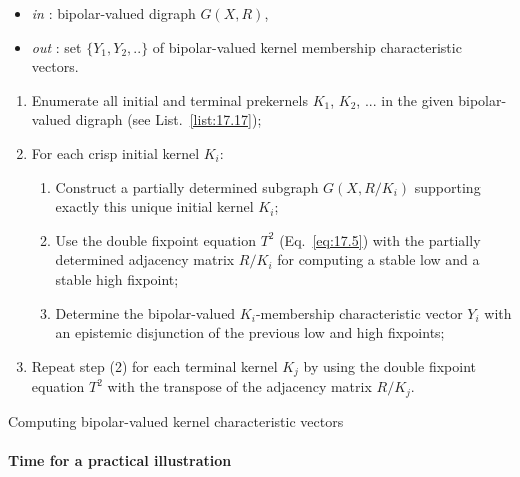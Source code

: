 \begin{algorithm}[H]
  {\footnotesize
\begin{itemize}
 \item [] \emph{in} : bipolar-valued digraph $G(X,R)$,
 \item [] \emph{out} : set $\{Y_1, Y_2, .. \}$ of bipolar-valued kernel membership characteristic vectors.
\end{itemize}
\begin{enumerate}
\item Enumerate all initial and terminal prekernels $K_1$, $K_2$, ... in the given bipolar-valued digraph (see List.~\vref{list:17.17});
\item For each crisp initial kernel $K_i$:
  \begin{enumerate}
  \item Construct a partially determined subgraph $G(X,R/K_i)$ supporting exactly this unique initial kernel $K_i$;
  \item Use the double fixpoint equation $T^2$ (Eq.~\ref{eq:17.5}) with the partially determined adjacency matrix $R/K_i$ for computing a stable low and a stable high fixpoint;
   \item \label{step:2.c} Determine the bipolar-valued $K_i$-membership characteristic vector $Y_i$ with an epistemic disjunction of the previous low and high fixpoints;
  \end{enumerate}
\item Repeat step (2) for each terminal kernel $K_j$ by using the double fixpoint equation $T^2$ with the transpose of the adjacency matrix $R/K_j$.
\end{enumerate}
}
\caption{Computing bipolar-valued kernel characteristic vectors}
\label{alg:17.1}
\end{algorithm}

\paragraph{\textbf{Time for a practical illustration}}

